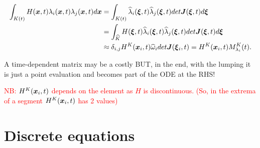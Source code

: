 \documentclass[english]{article}
\theoremstyle{thmstyleone}
\theoremstyle{thmstyletwo}
\theoremstyle{thmstylethree}
\newcommand{\uvec}[2][3]{\boldsymbol{#2\mkern-#1mu}\mkern#1mu}
\newcommand{\hl}{\widehat{\lambda}}
\begin{document}
%

\begin{align}
\begin{split}
\int_{K(t)}H(\uvec{x},t) \lambda_i(\uvec{x},t)\lambda_j(\uvec{x},t)d\uvec{x}&=\int_{K(t)} \hl_i(\uvec{\xi},t)\hl_j(\uvec{\xi},t) det \uvec{J}(\uvec{\xi},t) d\uvec{\xi}\\
&=\int_{\widehat{K}}H(\uvec{\xi},t) \hl_i(\uvec{\xi},t)\hl_j(\uvec{\xi},t) det \uvec{J}(\uvec{\xi},t) d\uvec{\xi}\\
&\approx \delta_{i,j}H^K(\uvec{x}_i,t)\widehat{\omega}_i det \uvec{J}(\uvec{\xi}_i,t)=H^K(\uvec{x}_i,t)M_{\lambda_i}^K(t).
\end{split}
\end{align}

A time-dependent matrix may be a costly BUT, in the end, with the lumping it is just a point evaluation and becomes part of the ODE at the RHS!

\textcolor{red}{NB: $H^K(\uvec{x}_i,t)$ depends on the element as $H$ is discontinuous. (So, in the extrema of a segment $H^K(\uvec{x}_i,t)$ has 2 values)}


\section{Discrete equations}
\end{document}
